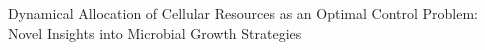 Dynamical Allocation of Cellular Resources as an Optimal Control Problem: Novel Insights into Microbial Growth Strategies